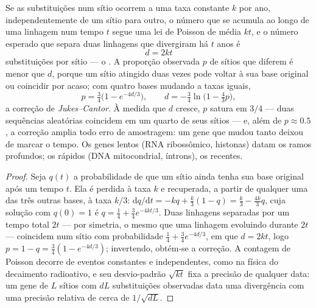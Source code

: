 \begin{theorem}\label{thm:b2:phylogenetic-trees:clock}
Se as substituições num sítio ocorrem a uma taxa constante $k$ por ano,
independentemente de um sítio para outro, o número que se acumula ao
longo de uma linhagem num tempo $t$ segue uma lei de Poisson de média
$kt$, e o número esperado que separa duas linhagens que divergiram há
$t$ anos é
\[
d = 2kt
\]
substituições por sítio --- o \emph{}. A proporção
observada $p$ de sítios que diferem é menor que $d$, porque um sítio
atingido duas vezes pode voltar à sua base original ou coincidir por
acaso; com quatro bases mudando a taxas iguais,
\[
p = \tfrac{3}{4}\bigl(1 - e^{-4d/3}\bigr), \qquad
d = -\tfrac{3}{4}\ln\bigl(1 - \tfrac{4}{3}p\bigr),
\]
a correção de \emph{Jukes--Cantor}. À medida que $d$ cresce, $p$ satura
em $3/4$ --- duas sequências aleatórias coincidem em um quarto de seus
sítios --- e, além de $p \approx 0.5$, a correção amplia todo erro de
amostragem: um gene que mudou tanto deixou de marcar o tempo. Os genes
lentos (RNA ribossômico, histonas) datam os ramos profundos; os rápidos
(DNA mitocondrial, íntrons), os recentes.
\end{theorem}
\begin{proof}
Seja $q(t)$ a probabilidade de que um sítio ainda tenha sua base
original após um tempo $t$. Ela é perdida à taxa $k$ e recuperada, a
partir de qualquer uma das três outras bases, à taxa $k/3$:
$\mathrm{d}q/\mathrm{d}t = -kq + \tfrac{k}{3}(1 - q) = \tfrac{k}{3} -
\tfrac{4k}{3}q$, cuja solução com $q(0) = 1$ é $q = \tfrac14 +
\tfrac34 e^{-4kt/3}$. Duas linhagens separadas por um tempo total $2t$ ---
por simetria, o mesmo que uma linhagem evoluindo durante $2t$ ---
coincidem num sítio com probabilidade $\tfrac14 + \tfrac34 e^{-4d/3}$, em que $d =
2kt$, logo $p = 1 - q = \tfrac34(1 - e^{-4d/3})$; invertendo, obtém-se a
correção. A contagem de Poisson decorre de eventos constantes e
independentes, como na física do decaimento radioativo, e seu
desvio-padrão $\sqrt{kt}$ fixa a precisão de qualquer data: um gene de $L$
sítios com $dL$ substituições observadas data uma divergência com uma
precisão relativa de cerca de $1/\sqrt{dL}$.
\end{proof}
